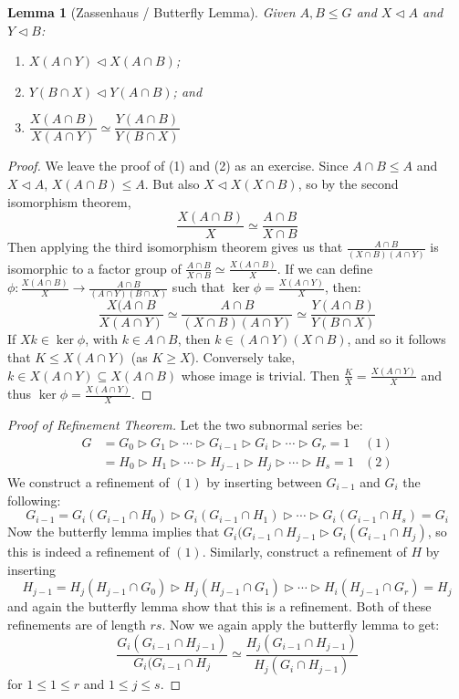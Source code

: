 \documentclass[a4paper,10pt]{article}
\newtheorem{Lem}[thm]{Lemma}
\begin{document}
\begin{Lem}[Zassenhaus / Butterfly Lemma]
Given $A, B \leq G$ and $X \triangleleft A$ and $Y \triangleleft B$: 
\begin{enumerate}
\item $X(A \cap Y) \triangleleft X (A \cap B)$;
\item $Y(B \cap X) \triangleleft Y ( A \cap B)$; and
\item $\dfrac{X (A \cap B)}{X(A \cap Y)} \simeq \dfrac{Y(A\cap B)}{Y(B \cap X)}$
\end{enumerate}
\end{Lem}

\begin{proof}
We leave the proof of (1) and (2) as an exercise. Since $A \cap B \leq A$ and $X \triangleleft A$, $X(A \cap B) \leq A$. But also $X \triangleleft X (X \cap B)$, so by the second isomorphism theorem, 
\[ \frac{X (A \cap B)}{X} \simeq \frac{A \cap B}{X \cap B} \]
Then applying the third isomorphism theorem gives us that $\frac{A \cap B}{(X \cap B)(A \cap Y)}$ is isomorphic to a factor group of $\frac{A \cap B}{X \cap B} \simeq \frac{X (A \cap B)}{X}$. If we can define $\phi : \frac{X(A \cap B)}{X} \rightarrow \frac{A \cap B}{(A \cap Y)(B \cap X)}$ such that $\ker \phi = \frac{X (A \cap Y)}{X}$, then:
\[ \frac{X(A\cap B}{X(A \cap Y)} \simeq \frac{A \cap B}{(X \cap B)(A \cap Y)} \simeq \frac{Y(A \cap B)}{Y(B \cap X)} \]
If $Xk \in \ker \phi$, with $k \in A\cap B$, then $k \in (A \cap Y)(X \cap B)$, and so it follows that $K \leq X(A \cap Y)$ (as $K \geq X$). Conversely take, $k \in X(A \cap Y) \subseteq X(A \cap B)$ whose image is trivial. Then $\frac{K}{X} = \frac{X(A\cap Y)}{X}$ and thus $\ker \phi = \frac{X(A \cap Y)}{X}$. 
\end{proof}


\begin{proof}[Proof of Refinement Theorem]
Let the two subnormal series be:
\begin{align*}
G &= G_0 \triangleright G_1 \triangleright \cdots \triangleright G_{i-1} \triangleright G_i \triangleright \cdots \triangleright G_r = 1 &(1)\\
  &= H_0 \triangleright H_1 \triangleright \cdots \triangleright H_{j-1} \triangleright H_j \triangleright \cdots \triangleright H_s = 1 &(2)
\end{align*}
We construct a refinement of $(1)$ by inserting between $G_{i-1}$ and $G_{i}$ the following:
\[ G_{i-1} = G_i (G_{i-1} \cap H_0) \triangleright G_i(G_{i-1} \cap H_1) \triangleright \cdots \triangleright G_i (G_{i-1} \cap H_s) = G_i \]
Now the butterfly lemma implies that $G_i(G_{i-1} \cap H_{j-1} \triangleright G_i(G_{i-1} \cap H_j)$, so this is indeed a refinement of $(1)$. Similarly, construct a refinement of $H$ by inserting 
\[ H_{j-1} = H_j (H_{j-1} \cap G_0) \triangleright H_j(H_{j-1} \cap G_1) \triangleright \cdots \triangleright H_i (H_{j-1} \cap G_r) = H_j \]
and again the butterfly lemma show that this is a refinement. Both of these refinements are of length $rs$. Now we again apply the butterfly lemma to get:
\[ \frac{G_i(G_{i-1} \cap H_{j-1})}{G_i(G_{i-1} \cap H_j} \simeq \frac{H_j (G_{i-1} \cap H_{j-1})}{H_j(G_i \cap H_{j-1})} \]
for $1 \leq 1 \leq r$ and $1 \leq j \leq s$.
\end{proof}
\end{document}
